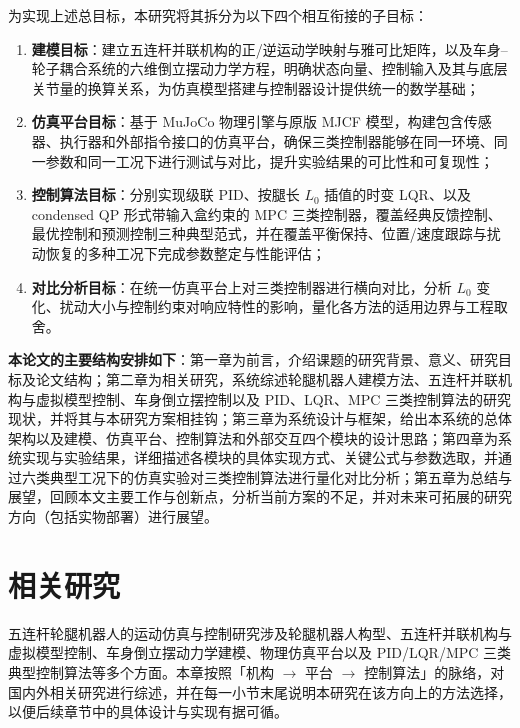 \documentclass{smbuthesis}
\begin{document}
为实现上述总目标，本研究将其拆分为以下四个相互衔接的子目标：

\begin{enumerate}
\item \textbf{建模目标}：建立五连杆并联机构的正/逆运动学映射与雅可比矩阵，以及车身--轮子耦合系统的六维倒立摆动力学方程，明确状态向量、控制输入及其与底层关节量的换算关系，为仿真模型搭建与控制器设计提供统一的数学基础；
\item \textbf{仿真平台目标}：基于 MuJoCo 物理引擎与原版 MJCF 模型，构建包含传感器、执行器和外部指令接口的仿真平台，确保三类控制器能够在同一环境、同一参数和同一工况下进行测试与对比，提升实验结果的可比性和可复现性；
\item \textbf{控制算法目标}：分别实现级联 PID、按腿长 $L_0$ 插值的时变 LQR、以及 condensed QP 形式带输入盒约束的 MPC 三类控制器，覆盖经典反馈控制、最优控制和预测控制三种典型范式，并在覆盖平衡保持、位置/速度跟踪与扰动恢复的多种工况下完成参数整定与性能评估；
\item \textbf{对比分析目标}：在统一仿真平台上对三类控制器进行横向对比，分析 $L_0$ 变化、扰动大小与控制约束对响应特性的影响，量化各方法的适用边界与工程取舍。
\end{enumerate}

\textbf{本论文的主要结构安排如下}：第一章为前言，介绍课题的研究背景、意义、研究目标及论文结构；第二章为相关研究，系统综述轮腿机器人建模方法、五连杆并联机构与虚拟模型控制、车身倒立摆控制以及 PID、LQR、MPC 三类控制算法的研究现状，并将其与本研究方案相挂钩；第三章为系统设计与框架，给出本系统的总体架构以及建模、仿真平台、控制算法和外部交互四个模块的设计思路；第四章为系统实现与实验结果，详细描述各模块的具体实现方式、关键公式与参数选取，并通过六类典型工况下的仿真实验对三类控制算法进行量化对比分析；第五章为总结与展望，回顾本文主要工作与创新点，分析当前方案的不足，并对未来可拓展的研究方向（包括实物部署）进行展望。

\chapter{相关研究}

五连杆轮腿机器人的运动仿真与控制研究涉及轮腿机器人构型、五连杆并联机构与虚拟模型控制、车身倒立摆动力学建模、物理仿真平台以及 PID/LQR/MPC 三类典型控制算法等多个方面。本章按照「机构 $\to$ 平台 $\to$ 控制算法」的脉络，对国内外相关研究进行综述，并在每一小节末尾说明本研究在该方向上的方法选择，以便后续章节中的具体设计与实现有据可循。
\end{document}
